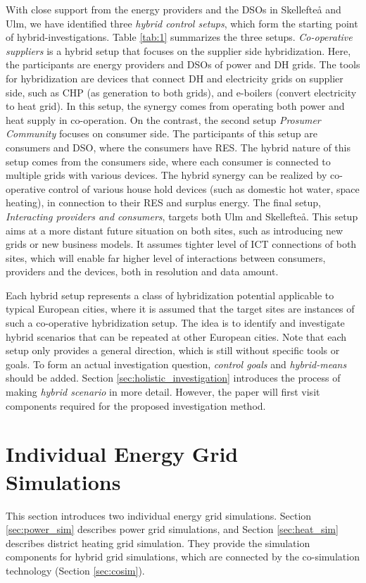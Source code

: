 \documentclass[review]{elsarticle}
\begin{document}
With close support from the energy providers and the DSOs 
in Skellefte{\aa} and Ulm, we have identified three {\em hybrid
  control setups}, which form the starting point of
hybrid-investigations.    
Table \ref{tab:1} summarizes the three setups. {\em Co-operative
  suppliers} is a hybrid setup that focuses on the supplier side
hybridization. Here, the participants are energy providers and DSOs of  
power and DH grids. The tools for hybridization are devices that
connect DH and electricity grids on supplier side,
such as CHP (as generation to both grids), and e-boilers (convert
electricity to heat grid). In this setup, the synergy comes from
operating both power and heat supply in co-operation. 
On the contrast, the second setup {\em Prosumer Community} focuses on
consumer side. The participants of this setup are consumers and DSO,
where the consumers have RES. The hybrid nature of this setup comes
from the consumers side, where each consumer is connected to multiple
grids with various devices. The hybrid synergy can be realized by
co-operative control of various house hold devices (such as domestic
hot water, space heating), in connection to their RES and surplus
energy. 
The final setup, {\em Interacting providers and consumers}, targets
both Ulm and Skellefte{\aa}. This setup aims at a more distant future
situation on both sites, such as introducing new grids or new business
models. It assumes tighter level of ICT connections of both sites,
which will enable far higher level of interactions between consumers,
providers and the devices, both in resolution and data amount.   

Each hybrid setup represents a class of hybridization potential
applicable to typical European cities, where it is assumed that the
target sites are instances of such a co-operative hybridization setup. 
The idea is to identify and investigate hybrid scenarios that can be
repeated at other European cities. Note that each setup only provides
a general direction, which is still without specific tools or
goals. To form an actual investigation question,  {\em control
  goals} and {\em hybrid-means} should be added. 
Section \ref{sec:holistic_investigation} introduces the process of
making {\em hybrid scenario} in more detail. However, the paper will
first visit components required for the proposed investigation
method. 

\section{Individual Energy Grid Simulations}
\label{sec:individual_sim}
This section introduces two individual energy grid
simulations. Section \ref{sec:power_sim} describes power grid
simulations, and Section \ref{sec:heat_sim} describes district heating
grid simulation. They provide the simulation components for hybrid grid 
simulations, which are connected by the co-simulation technology
(Section \ref{sec:cosim}). 
\end{document}
